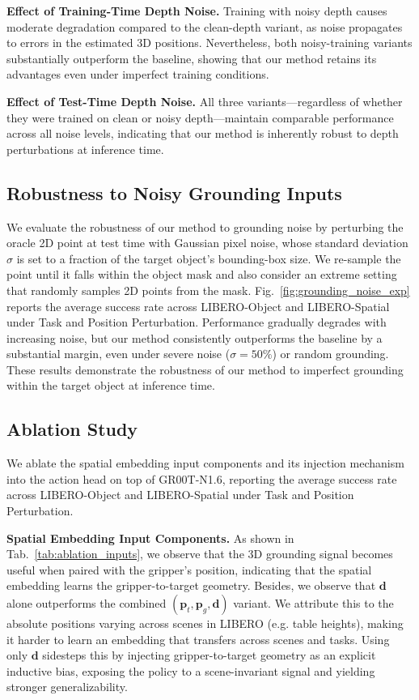  
\noindent\textbf{Effect of Training-Time Depth Noise.} Training with noisy depth causes moderate degradation compared to the clean-depth variant, as noise propagates to errors in the estimated 3D positions. Nevertheless, both noisy-training variants substantially outperform the baseline, showing that our method retains its advantages even under imperfect training conditions.

\noindent\textbf{Effect of Test-Time Depth Noise.} All three variants---regardless of whether they were trained on clean or noisy depth---maintain comparable performance across all noise levels, indicating that our method is inherently robust to depth perturbations at inference time.

\subsection{Robustness to Noisy Grounding Inputs}
\label{sec:gnd_noise_exp}
 
We evaluate the robustness of our method to grounding noise by perturbing the oracle 2D point at test time with Gaussian pixel noise, whose standard deviation $\sigma$ is set to a fraction of the target object's bounding-box size. We re-sample the point until it falls within the object mask and also consider an extreme setting that randomly samples 2D points from the mask. 
Fig.~\ref{fig:grounding_noise_exp} reports the average success rate across LIBERO-Object and LIBERO-Spatial under Task and Position Perturbation.
Performance gradually degrades with increasing noise, but our method consistently outperforms the baseline by a substantial margin, even under severe noise ($\sigma=50\%$) or random grounding. These results demonstrate the robustness of our method to imperfect grounding within the target object at inference time.

\subsection{Ablation Study}

We ablate the spatial embedding input components and its injection mechanism into the action head on top of GR00T-N1.6, reporting the average success rate across LIBERO-Object and LIBERO-Spatial under Task and Position Perturbation.

\noindent\textbf{Spatial Embedding Input Components.}
As shown in Tab.~\ref{tab:ablation_inputs}, we observe that the 3D grounding signal becomes useful when paired with the gripper's position, indicating that the spatial embedding learns the gripper-to-target geometry. Besides, we observe that $\mathbf{d}$ alone outperforms the combined $(\mathbf{p}_t, \mathbf{p}_g, \mathbf{d})$ variant. We attribute this to the absolute positions varying across scenes in LIBERO (e.g. table heights), making it harder to learn an embedding that transfers across scenes and tasks. Using only $\mathbf{d}$ sidesteps this by injecting gripper-to-target geometry as an explicit inductive bias, exposing the policy to a scene-invariant signal and yielding stronger generalizability.

